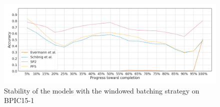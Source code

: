 \begin{figure}[!htb]
    \centering
    \includegraphics[width=\textwidth]{gfx/bpic2015_1/windowed_stability.png}
    \caption{Stability of the models with the windowed batching strategy on BPIC15-1}
    \label{fig:bpic15-1-windowed-stability}
\end{figure}

\FloatBarrier
